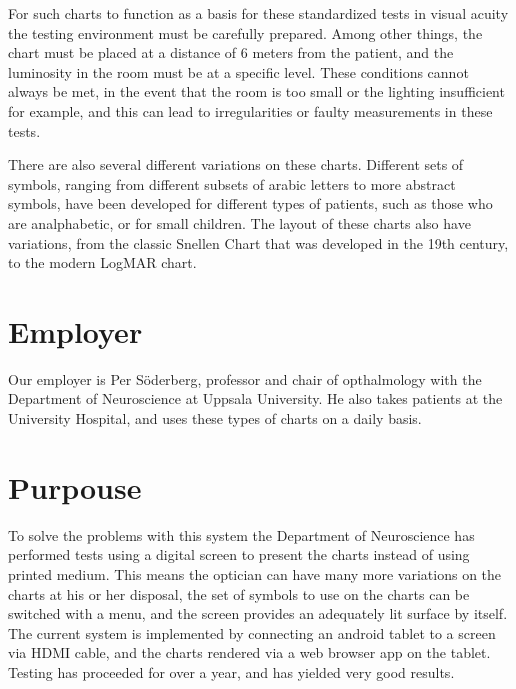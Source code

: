 \documentclass[12pt,a4paper,notitlepage]{report}
\begin{document}
For such charts to function as a basis for these standardized tests in visual acuity the testing environment must be carefully prepared. Among other things, the chart must be placed at a distance of 6 meters from the patient, and the luminosity in the room must be at a specific level. These conditions cannot always be met, in the event that the room is too small or the lighting insufficient for example, and this can lead to irregularities or faulty measurements in these tests. 


There are also several different variations on these charts. Different sets of symbols, ranging from different subsets of arabic letters to more abstract symbols, have been developed for different types of patients, such as those who are analphabetic, or for small children. The layout of these charts also have variations, from the classic Snellen Chart that was developed in the 19th century, to the modern LogMAR chart.

\section{Employer}


Our employer is Per Söderberg, professor and chair of opthalmology with the Department of Neuroscience at Uppsala University. He also takes patients at the University Hospital, and uses these types of charts on a daily basis. 

\section{Purpouse}
To solve the problems with this system the Department of Neuroscience has performed tests using a digital screen to present the charts instead of using printed medium. This means the optician can have many more variations on the charts at his or her disposal, the set of symbols to use on the charts can be switched with a menu, and the screen provides an adequately lit surface by itself. The current system is implemented by connecting an android tablet to a screen via HDMI cable, and the charts rendered via a web browser app on the tablet. Testing has proceeded for over a year, and has yielded very good results.
\end{document}
